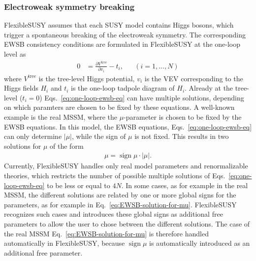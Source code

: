 \documentclass[final,3p,11pt,pdflatex]{elsarticle}
\makeatletter
\newcommand{\fs}{FlexibleSUSY\@\xspace}
\DeclareMathOperator{\sign}{sign}
\makeatother
\begin{document}
\subsubsection{Electroweak symmetry breaking}
\label{sec:ewsb}

\fs assumes that each SUSY model contains Higgs bosons, which trigger
a spontaneous breaking of the electroweak symmetry.  The corresponding
EWSB consistency conditions are formulated in \fs at the one-loop
level as
%
\begin{align}
  0 &= \frac{\partial V^\text{tree}}{\partial v_i} - t_i,
  & & (i=1,\ldots,N)
  \label{eq:one-loop-ewsb-eq}
\end{align}
%
where $V^\text{tree}$ is the tree-level Higgs potential, $v_i$ is the
VEV corresponding to the Higgs fields $H_i$ and $t_i$ is the one-loop
tadpole diagram of $H_i$.  Already at the tree-level ($t_i = 0$) Eqs.\
\eqref{eq:one-loop-ewsb-eq} can have multiple solutions, depending on
which paramters are chosen to be fixed by these equations.  A
well-known example is the real MSSM, where the $\mu$-parameter is
chosen to be fixed by the EWSB equations.  In this model, the EWSB
equations, Eqs.\ \eqref{eq:one-loop-ewsb-eq} can only determine
$|\mu|$, while the sign of $\mu$ is not fixed.  This results in two
solutions for $\mu$ of the form
%
\begin{align}
  \mu = \sign\mu \cdot |\mu| .
  \label{eq:EWSB-solution-for-mu}
\end{align}
%
Currently, \fs handles only real model parameters and renormalizable
theories, which restricts the number of possible multiple solutions of
Eqs.\ \eqref{eq:one-loop-ewsb-eq} to be less or equal to $4N$.  In
some cases, as for example in the real MSSM, the different solutions
are related by one or more global signs for the parameters, as for example in
Eq.~\eqref{eq:EWSB-solution-for-mu}.  \fs recognizes such cases and
introduces these global signs as additional free parameters to allow
the user to chose between the different solutions.  The case of the
real MSSM Eq.~\eqref{eq:EWSB-solution-for-mu} is therefore handled
automatically in \fs, because $\sign\mu$ is automatically introduced
as an additional free parameter.
\end{document}
